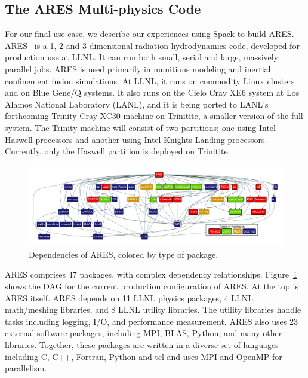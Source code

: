 
\subsection{The ARES Multi-physics Code}
\label{sec:ares}

For our final use case, we describe our experiences using Spack to build ARES.
ARES~\cite{ares1,ares2} is a 1, 2 and 3-dimensional radiation hydrodynamics code,
developed for production use at LLNL.  It can run both small, serial
and large, massively parallel jobs. ARES is used primarily in munitions modeling
and inertial confinement fusion simulations.
%
At LLNL, it runs on commodity Linux clusters and on Blue Gene/Q systems.
It also runs on the Cielo Cray XE6 system at Los Alamos National Laboratory (LANL), and
it is being ported to LANL's forthcoming Trinity Cray XC30 machine on Trinitite,
a smaller version of the full system.  The Trinity machine will consist of two partitions;
one using Intel Haswell processors and another using Intel Knights Landing processors.
Currently, only the Haswell partition is deployed on Trinitite.

\begin{figure}[t]
	\includegraphics[width=\textwidth]{figs/ares-dot/ares-fig.pdf}
	\caption{
		Dependencies of ARES, colored by type of package.
		\label{fig:ares}
	}
\end{figure}

ARES comprises 47 packages, with complex dependency relationships. 
Figure~\ref{fig:ares} shows the DAG for the current production configuration 
of ARES. At the top is ARES itself.  ARES depends on 11 LLNL physics packages,
4 LLNL math/meshing libraries, and 8 LLNL utility libraries.
The utility libraries handle tasks including logging, I/O, and 
performance measurement. ARES also uses 23 external software packages, 
including MPI, BLAS, Python, and many other libraries.  Together, these 
packages are written in a diverse set of languages including C, C++, 
Fortran, Python and tcl and uses MPI and OpenMP for parallelism.

